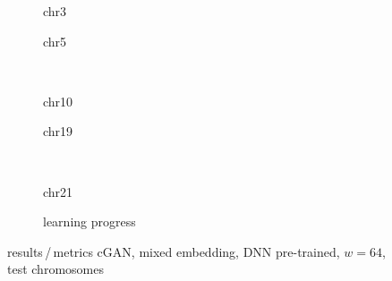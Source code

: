 \begin{figure}[p] %
    \begin{subfigure}{0.45\textwidth}
        \scriptsize
        \caption{chr3}
    \end{subfigure} \hfill
    \begin{subfigure}{0.45\textwidth}
        \scriptsize
        \caption{chr5}
    \end{subfigure}\\[5mm]
    \begin{subfigure}{0.45\textwidth}
        \scriptsize
        \caption{chr10}
    \end{subfigure}\hfill
    \begin{subfigure}{0.45\textwidth}
        \scriptsize
        \caption{chr19}
    \end{subfigure}\\[3mm]
    \centering
    \begin{subfigure}{0.45\textwidth}
        \scriptsize
        \caption{chr21}
    \end{subfigure} \hfill
    \begin{subfigure}{0.45\textwidth}
        \scriptsize
        \caption{learning progress} \label{fig:results:GAN64_pretrained_mixed_lossEpochs}
    \end{subfigure}
    \caption{results\,/\,metrics cGAN, mixed embedding, DNN pre-trained, $w=64$, test chromosomes}   \label{fig:results:GAN64_pretrained_mixed_pearson}
\end{figure}
